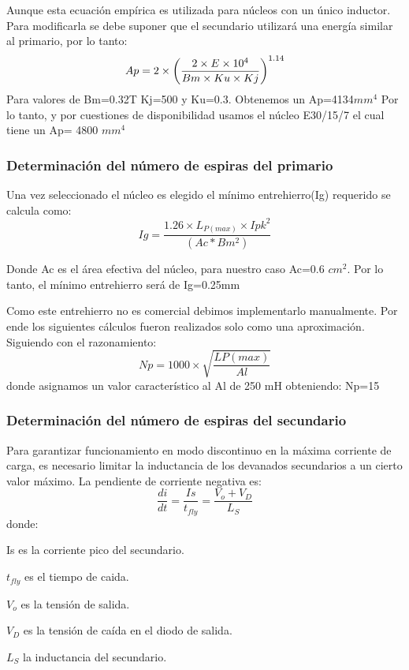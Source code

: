 Aunque esta ecuación empírica es utilizada para núcleos con un único inductor. Para modificarla se debe suponer que el secundario utilizará una energía similar al primario, por lo tanto:
$$
A p= 2 \times {\left( \frac{  2 \times E \ensuremath{\times 10^{4}}}{Bm \times Ku \times Kj} \right) } ^{ 1.14}
$$
Para valores de Bm=0.32T  Kj=500 y Ku=0.3. Obtenemos un Ap=4134$mm^4$
Por lo tanto, y por cuestiones de disponibilidad usamos el núcleo E30/15/7 el cual tiene un Ap= 4800 $mm^4$

\subsubsection{Determinación del número de espiras del primario}

Una vez seleccionado el núcleo es elegido el mínimo entrehierro(Ig) requerido se calcula como:
$$
Ig= \frac{1.26 \times L_{P(max)} \times Ipk^2}{(Ac*Bm^2)}
$$

Donde Ac es el área efectiva del núcleo, para nuestro caso Ac=0.6 $cm^2$. Por lo tanto, el mínimo entrehierro será de Ig=0.25mm

Como este entrehierro no es comercial debimos implementarlo manualmente. Por ende los siguientes cálculos fueron realizados solo como una aproximación.
Siguiendo con el razonamiento:
$$
Np= 1000 \times \sqrt{\frac{L{P(max)}}{Al}}
$$
donde asignamos un valor característico al Al de 250 mH obteniendo: Np=15
\medskip
\subsubsection{Determinación del número de espiras del secundario}

Para garantizar funcionamiento en modo discontinuo en la máxima corriente de carga, es necesario limitar la inductancia de los devanados secundarios a un cierto valor máximo. La pendiente de corriente negativa es:
$$
\frac{di}{dt}= \frac{Is}{t_{fly}} = \frac{V_o+V_D}{L_S}
$$
donde:
\begin{list}{ }
\item  Is es la corriente pico del secundario.
\item $t_{fly}$ es el tiempo de caida. 
\item $V_o$ es la tensión de salida. 
\item $V_D$ es la tensión de caída en el diodo de salida.
\item $L_S$ la inductancia del secundario.
\item
\end{list}

